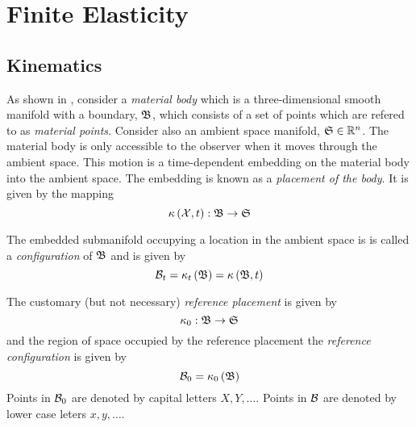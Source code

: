 \section{Finite Elasticity}
\label{subsec:FiniteElasticity}


\subsection{Kinematics}

As shown in , consider a \emph{material
  body} which is a three-dimensional smooth manifold with a boundary, $ \mathfrak{B} $,
which consists of a set of points which are refered to as \emph{material
  points}. Consider also an ambient space manifold,
$\manifold{S}\in\rntopology{n}$. The material body is only accessible to
the observer when it moves through the ambient space. This motion is a
time-dependent embedding on the material body into the ambient space. The
embedding is known as a \emph{placement of the body}. It is given by the
mapping
\begin{equation}
   \kappa\left( \mathcal{X},t \right) : \mathfrak{B} \rightarrow \mathfrak{S} 
\end{equation}

The embedded submanifold occupying a location in the ambient space is is
called a \emph{configuration} of $ \mathfrak{B} $ and is given by
\begin{equation}
   \mathcal{B} _{t}= \kappa_{t}\left(  \mathfrak{B}  \right) = \kappa\left(  \mathfrak{B} ,t \right) 
\end{equation}

The customary (but not necessary) \emph{reference placement} is given by
\begin{equation}
  \kappa_{0}: \mathfrak{B} \rightarrow \mathfrak{S} 
\end{equation}
and the region of space occupied by the reference placement \ie the
\emph{reference configuration} is given by
\begin{equation}
   \mathcal{B} _{0}= \kappa_{0}\left(  \mathfrak{B}  \right) 
\end{equation}
Points in $ \mathcal{B} _{0}$ are denoted by capital letters \ie $X, Y,
\ldots$. Points in $ \mathcal{B} $ are denoted by lower case leters \ie
$x, y, \dots$.


